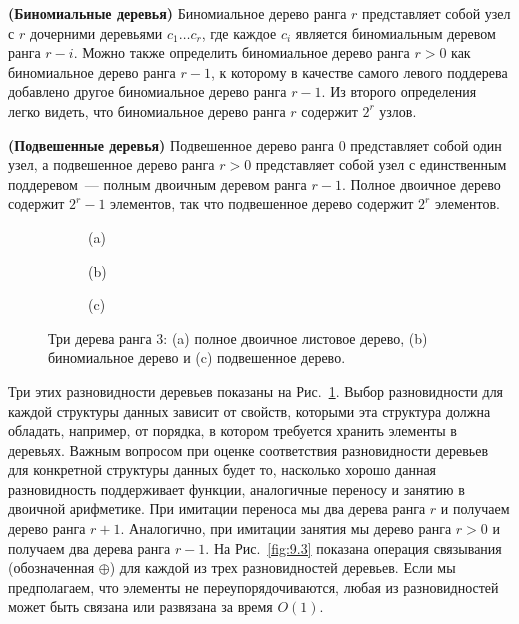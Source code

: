 \begin{definition}
  \textbf{(Биномиальные деревья)} Биномиальное дерево ранга $r$
  представляет собой узел с $r$ дочерними деревьями $c_1 \ldots c_r$,
  где каждое $c_i$ является биномиальным деревом ранга $r -
  i$. Можно также определить биномиальное дерево ранга $r > 0$ как
  биномиальное дерево ранга $r - 1$, к которому в качестве самого
  левого поддерева добавлено другое биномиальное дерево ранга $r -
  1$. Из второго определения легко видеть, что биномиальное дерево
  ранга $r$ содержит $2^r$ узлов.
\end{definition}

\begin{definition}
  \textbf{(Подвешенные деревья)} Подвешенное дерево ранга 0 представляет собой один узел, а
  подвешенное дерево ранга $r > 0$ представляет собой узел с единственным
  поддеревом~--- полным двоичным деревом ранга $r - 1$. Полное
  двоичное дерево содержит $2^r - 1$ элементов, так что подвешенное дерево
  содержит $2^r$ элементов.
\end{definition}

\begin{figure}
  \begin{subfigure}[b]{0.3\textwidth}
    \centering
    \par\vspace{0.2cm}
    (a)
  \end{subfigure}
  \begin{subfigure}[b]{0.3\textwidth}
    \centering
    \par\vspace{0.2cm}
    (b)
  \end{subfigure}
  \begin{subfigure}[b]{0.3\textwidth}
    \centering
    \par\vspace{0.2cm}
    (c)
  \end{subfigure}
  \caption{Три дерева ранга 3: (a) полное двоичное листовое дерево,
    (b) биномиальное дерево и (c) подвешенное дерево.}
  \label{fig:9.2}
\end{figure}

Три этих разновидности деревьев показаны на
Рис.~\ref{fig:9.2}. Выбор разновидности для каждой структуры данных
зависит от свойств, которыми эта структура должна обладать, например,
от порядка, в котором требуется хранить элементы в деревьях. Важным
вопросом при оценке соответствия разновидности деревьев для конкретной
структуры данных будет то, насколько хорошо данная разновидность
поддерживает функции, аналогичные переносу и занятию в двоичной
арифметике. При имитации переноса мы  два дерева
ранга $r$ и получаем дерево ранга $r+1$. Аналогично, при имитации
занятия мы  дерево ранга $r > 0$ и получаем
два дерева ранга $r-1$. На Рис.~\ref{fig:9.3} показана операция
связывания (обозначенная $\oplus$)
для каждой из трех разновидностей деревьев. Если мы предполагаем, что
элементы не переупорядочиваются, любая из разновидностей может быть
связана или развязана за время $O(1)$.

